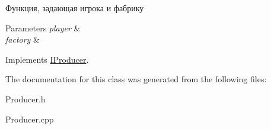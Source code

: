 Функция, задающая игрока и фабрику 


\begin{DoxyParams}{Parameters}
{\em player} & \\
\hline
{\em factory} & \\
\hline
\end{DoxyParams}


Implements \hyperlink{classIProducer_a5432b60205e45d23d0ec57f92d1c670f}{I\+Producer}.



The documentation for this class was generated from the following files\+:\begin{DoxyCompactItemize}
\item 
Producer.\+h\item 
Producer.\+cpp\end{DoxyCompactItemize}
